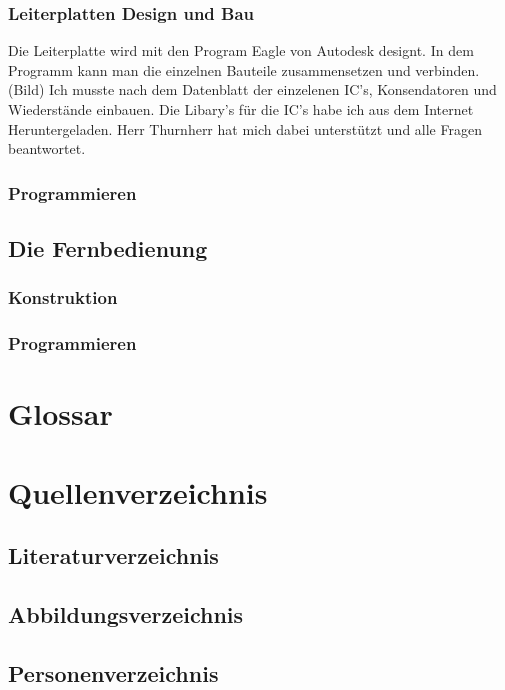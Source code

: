\documentclass[12pt,a4paper, ngerman]{article}
\begin{document}
\subsubsection{Leiterplatten Design und Bau}
Die Leiterplatte wird mit den Program Eagle von Autodesk designt. In dem Programm kann man die einzelnen Bauteile zusammensetzen und verbinden. (Bild) Ich musste nach dem Datenblatt der einzelenen IC's, Konsendatoren und Wiederstände einbauen. Die Libary's für die IC's habe ich aus dem Internet Heruntergeladen. Herr Thurnherr hat mich dabei unterstützt und alle Fragen beantwortet. 
\subsubsection{Programmieren}
\subsection{Die Fernbedienung}
\subsubsection{Konstruktion}
\subsubsection{Programmieren}
\newpage
\section{Glossar}


\newpage
\section{Quellenverzeichnis}
\subsection{Literaturverzeichnis}
\subsection{Abbildungsverzeichnis}
\subsection{Personenverzeichnis}
\end{document}
